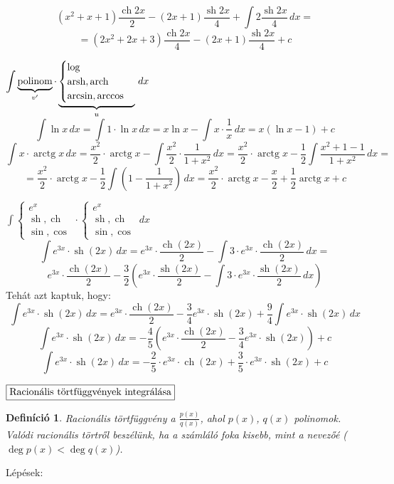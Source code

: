 \documentclass[a4paper,12pt,twoside]{book}
\DeclareMathOperator{\arctg}{arctg}
\DeclareMathOperator{\sh}{sh} %
\DeclareMathOperator{\ch}{ch} %
\DeclareMathOperator{\arsh}{arsh}
\DeclareMathOperator{\arch}{arch}
\newtheorem{defi}{Definíció}[chapter]
\theoremstyle{break}
\theoremstyle{plain}
\newcommand{\integ}[1]{\ensuremath{\int #1\, dx}}
\begin{document}
\begin{list}{.}{\leftmargin=1.5em}
\begin{list}{)}{\leftmargin=1.5em}
      \[(x^2+x+1)\frac{\ch 2x}{2} - (2x+1)\frac{\sh 2x}{4}+\integ{2\frac{\sh 2x}{4}} = \]
      \[ = (2x^2+2x+3)\frac{\ch 2x}{4} - (2x+1)\frac{\sh 2x}{4} + c\]
    \item $\displaystyle \integ{\underbrace{\hbox{polinom}}_{v'}\cdot\underbrace{\begin{cases}\log\\\arsh, \arch\\\arcsin, \arccos\end{cases}}_{u}}$
    \[\integ{\ln x} = \integ{1\cdot \ln x} = x\ln x - \integ{x\cdot \frac{1}{x}} = x(\ln x - 1) + c\]
    \[\integ{x\cdot \arctg x} = \frac{x^2}{2}\cdot\arctg x - \integ{\frac{x^2}{2}\cdot\frac{1}{1+x^2}} = \frac{x^2}{2}\cdot\arctg x - \frac{1}{2}\integ{\frac{x^2+1-1}{1+x^2}} = \]
    \[= \frac{x^2}{2}\cdot\arctg x - \frac{1}{2}\integ{\left(1-\frac{1}{1+x^2}\right)} = \frac{x^2}{2}\cdot\arctg x - \frac{x}{2}+\frac{1}{2}\arctg x + c\]
    \item $\displaystyle \integ{\begin{cases}e^x\\\sh, \ch\\\sin, \cos\end{cases}\cdot\begin{cases}e^x\\\sh, \ch\\\sin, \cos\end{cases}}$
    \[\integ{e^{3x}\cdot \sh(2x)} = e^{3x}\cdot \frac{\ch(2x)}{2}-\integ{3\cdot e^{3x}\cdot \frac{\ch(2x)}{2}} = \]
    \[ e^{3x}\cdot \frac{\ch(2x)}{2}-\frac{3}{2}\left(e^{3x}\cdot\frac{\sh(2x)}{2}-\integ{3\cdot e^{3x}\cdot\frac{\sh(2x)}{2}} \right)\]
    Tehát azt kaptuk, hogy:
    \[\integ{e^{3x}\cdot \sh(2x)} = e^{3x}\cdot \frac{\ch(2x)}{2}-\frac{3}{4}e^{3x}\cdot\sh(2x) +\frac{9}{4}\integ{ e^{3x}\cdot\sh(2x)}\]
    \[\integ{e^{3x}\cdot \sh(2x)} = -\frac{4}{5}\left(e^{3x}\cdot \frac{\ch(2x)}{2}-\frac{3}{4}e^{3x}\cdot\sh(2x)\right) + c\]
    \[\integ{e^{3x}\cdot \sh(2x)} = -\frac{2}{5}\cdot e^{3x}\cdot\ch(2x)+\frac{3}{5}\cdot e^{3x}\cdot\sh(2x) + c\]
  \end{list}
 \item $\boxed{$Racionális törtfüggvények integrálása$}$
  \begin{defi}
   Racionális törtfüggvény a $\displaystyle \frac{p(x)}{q(x)}$, ahol $p(x)$, $q(x)$ polinomok. Valódi racionális törtről beszélünk, ha a számláló foka kisebb, mint a nevezőé ($\deg p(x) < \deg q(x)$).
  \end{defi}
  Lépések:
  \begin{list}{)}{\leftmargin=1.5em}

\end{list}
\end{list}
\end{document}
